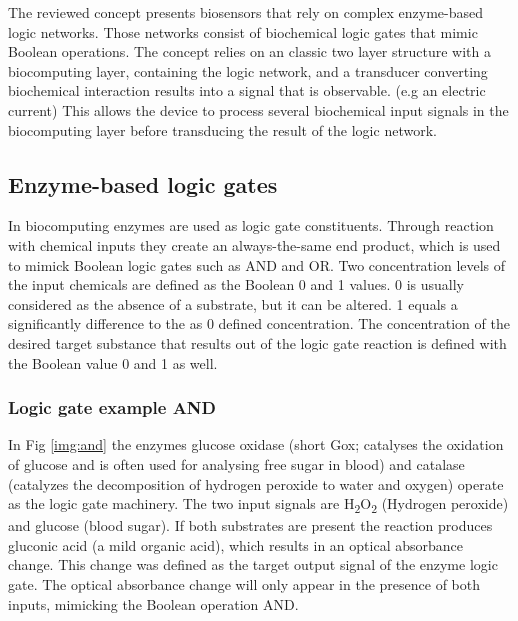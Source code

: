 \documentclass[runningheads]{llncs}
\begin{document}
The reviewed concept presents biosensors that rely on complex enzyme-based logic networks. Those networks consist of biochemical logic gates that mimic Boolean operations. The concept relies on an classic two layer structure with a biocomputing layer, containing the logic network, and a transducer converting biochemical interaction results into a signal that is observable. (e.g an electric current) This allows the device to process several biochemical input signals in the biocomputing layer before transducing the result of the logic network. \cite{application review}\cite{original}\cite{state of the art}


\subsection{Enzyme-based logic gates}		
		In biocomputing enzymes are used as logic gate constituents. Through reaction with chemical inputs they create an always-the-same end product, which is used to mimick Boolean logic gates such as AND and OR. Two concentration levels of the input chemicals are defined as the Boolean 0 and 1 values. 0 is usually considered as the absence of a substrate, but it can be altered. 1 equals a significantly difference to the as 0 defined concentration. 
		The concentration of the desired target substance that results out of the logic gate reaction is defined with the Boolean value 0 and 1 as well. \cite{original} \cite{haupt}\\
	
		\subsubsection{Logic gate example AND}
		In Fig \ref{img:and} the enzymes glucose oxidase (short Gox; catalyses the oxidation of glucose and is often used for analysing free sugar in blood) and catalase (catalyzes the decomposition of hydrogen peroxide to water and oxygen) operate as the logic gate machinery. The two input signals are H\textsubscript{2}O\textsubscript{2} (Hydrogen peroxide) and glucose (blood sugar). If both substrates are present the reaction produces gluconic acid (a mild organic acid), which results in an optical absorbance change. This change was defined as the target output signal of the enzyme logic gate. The optical absorbance change will only appear in the presence of both inputs, mimicking the Boolean operation AND. \cite{original}\cite{haupt}\cite{chemie}
		
\end{document}
